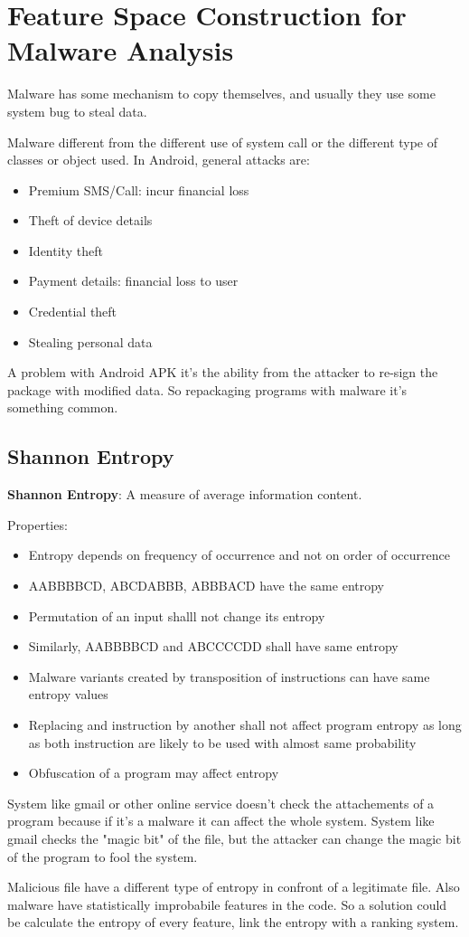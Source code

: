 \section{Feature Space Construction for Malware Analysis}
Malware has some mechanism to copy themselves, and usually they use some system
bug to steal data.

Malware different from the different use of system call or the different type
of classes or object used.
In Android, general attacks are:
\begin{itemize}
  \item Premium SMS/Call: incur financial loss
  \item Theft of device details
  \item Identity theft
  \item Payment details: financial loss to user
  \item Credential theft
  \item Stealing personal data
\end{itemize}

A problem with Android APK it's the ability from the attacker to re-sign the
package with modified data.
So repackaging programs with malware it's something common.

\subsection{Shannon Entropy}
\textbf{Shannon Entropy}: A measure of average information content.

Properties:
\begin{itemize}
  \item Entropy depends on frequency of occurrence and not on order of
occurrence
\item AABBBBCD, ABCDABBB, ABBBACD have the same entropy
\item Permutation of an input shalll not change its entropy
\item Similarly, AABBBBCD and ABCCCCDD shall have same entropy
\item Malware variants created by transposition of instructions can have same
entropy values
\item Replacing and instruction by another shall not affect program entropy as
long as both instruction are likely to be used with almost same probability
\item Obfuscation of a program may affect entropy
\end{itemize}

System like gmail or other online service doesn't check the attachements of a
program because if it's a malware it can affect the whole system. System like
gmail checks the "magic bit" of the file, but the attacker can change the magic
bit of the program to fool the system.

Malicious file have a different type of entropy in confront of a legitimate
file. Also malware have statistically improbabile features in the code.
So a solution could be calculate the entropy of every feature, link the entropy
with a ranking system.
